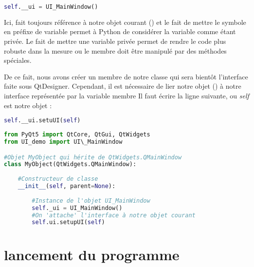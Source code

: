 \documentclass[12pt]{report}    %
\begin{document}
\begin{lstlisting}[language=Python]
        self.__ui = UI_MainWindow()
\end{lstlisting}

Ici,  fait toujours référence à notre objet courant () et le fait de mettre le symbole \bold{\_\_} en préfixe de variable permet à Python de considérer la variable comme étant privée. \newline 
Le fait de mettre une variable privée permet de rendre le code plus robuste dans la mesure ou le membre doit être manipulé par des méthodes spéciales.\newline


De ce fait, nous avons créer un membre de notre classe qui sera bientôt l'interface faite sous QtDesigner. \newline
Cependant, il est nécessaire de lier notre objet () à notre interface représentée par la variable membre  \newline
Il faut écrire la ligne suivante, ou \textit{self} est notre objet  : 

\begin{lstlisting}[language=Python]
        self.__ui.setuUI(self)
\end{lstlisting} \newline

\newline




\begin{lstlisting}[language=Python]
from PyQt5 import QtCore, QtGui, QtWidgets
from UI_demo import UI\_MainWindow

#Objet MyObject qui hérite de QtWidgets.QMainWindow
class MyObject(QtWidgets.QMainWindow):
    
    #Constructeur de classe
    __init__(self, parent=None):
        
        #Instance de l'objet UI_MainWindow
        self._ui = UI_MainWindow()
        #On 'attache' l'interface à notre objet courant
        self.ui.setupUI(self)

\end{lstlisting}



\section{lancement du programme}
\end{document}
